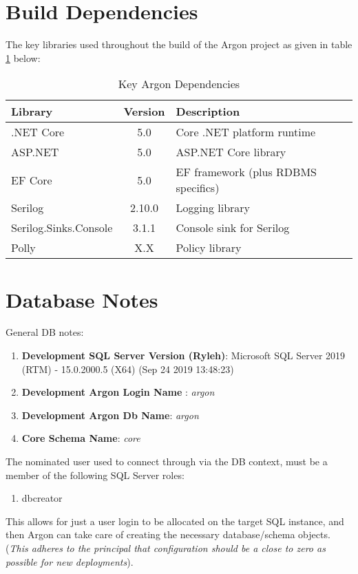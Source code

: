 \documentclass{book}
\begin{document}
\section{Build Dependencies}
The key libraries used throughout the build of the Argon project as given in table \ref{table_dependencies} below:
\begin{table}[h!]
    \centering
    \begin{tabular}{||l | c | l ||}
        \hline
        \textbf{Library} & \textbf{Version} & \textbf{Description} \\
        \hline
        .NET Core & 5.0 & Core .NET platform runtime\\
        ASP.NET & 5.0 & ASP.NET Core library \\
        EF Core & 5.0 & EF framework (plus RDBMS specifics)\\
        Serilog & 2.10.0 & Logging library\\
        Serilog.Sinks.Console & 3.1.1 & Console sink for Serilog \\
        Polly & X.X & Policy library\\
        \hline 
    \end{tabular}
    \caption{Key Argon Dependencies}
    \label{table_dependencies}
\end{table}

\section{Database Notes}
General DB notes:
\begin{enumerate}
    \item \textbf{Development SQL Server Version (Ryleh)}: Microsoft SQL Server 2019 (RTM) - 15.0.2000.5 (X64) (Sep 24 2019 13:48:23)
    \item \textbf{Development Argon Login Name} : \textit{argon}
    \item \textbf{Development Argon Db Name}: \textit{argon}
    \item \textbf{Core Schema Name}: \textit{core} 
\end{enumerate}
The nominated user used to connect through via the DB context, must be a member of the following SQL Server roles:
\begin{enumerate}
    \item dbcreator
\end{enumerate}
This allows for just a user login to be allocated on the target SQL instance, and then Argon can take care of creating the necessary database/schema objects.  (\textit{This adheres to the principal that configuration should be a close to zero as possible for new deployments}).
\end{document}
